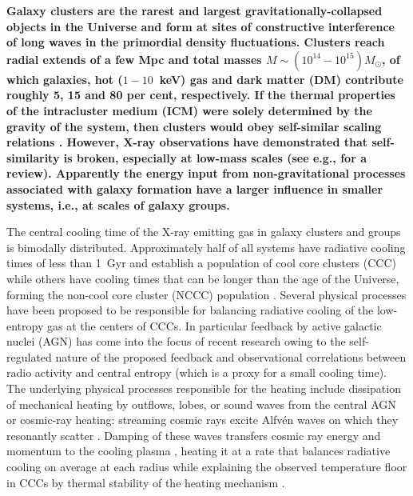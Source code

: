 \documentclass[useAMS,usenatbib]{mn2e}
\begin{document}
{\bf Galaxy clusters are the rarest and largest gravitationally-collapsed
  objects in the Universe and form at sites of constructive interference of long
  waves in the primordial density fluctuations. Clusters reach radial extends of
  a few Mpc and total masses $M \sim (10^{14} - 10^{15}) M_{\odot}$, of which
  galaxies, hot ($1-10$~keV) gas and dark matter (DM) contribute roughly 5, 15
  and 80 per cent, respectively. If the thermal properties of the intracluster medium
  (ICM) were solely determined by the gravity of the system, then clusters would
  obey self-similar scaling relations \citep{1986MNRAS.222..323K}.  However,
  X-ray observations have demonstrated that self-similarity is broken,
  especially at low-mass scales (see e.g., \citealp{2005RvMP...77..207V} for a
  review). Apparently the energy input from non-gravitational processes
  associated with galaxy formation have a larger influence in smaller systems,
  i.e., at scales of galaxy groups.

  The central cooling time of the X-ray emitting gas in galaxy clusters and
  groups is bimodally distributed. Approximately half of all systems have
  radiative cooling times of less than 1~Gyr and establish a population of cool
  core clusters (CCC) while others have cooling times that can be longer than
  the age of the Universe, forming the non-cool core cluster (NCCC) population
  \citep{2009ApJS..182...12C,2010A&A...513A..37H}. Several physical processes
  have been proposed to be responsible for balancing radiative cooling of the
  low-entropy gas at the centers of CCCs. In particular feedback by active
  galactic nuclei (AGN) has come into the focus of recent research
  \citep{2007ARA&A..45..117M, 2012NJPh...14e5023M} owing to the self-regulated
  nature of the proposed feedback and observational correlations between radio
  activity and central entropy (which is a proxy for a small cooling time). The
  underlying physical processes responsible for the heating include dissipation
  of mechanical heating by outflows, lobes, or sound waves from the central AGN
  \citep[e.g.,][]{2001ApJ...554..261C, 2002Natur.418..301B, 2002ApJ...581..223R,
    2012MNRAS.424..190G} or cosmic-ray heating: streaming cosmic rays excite
  Alfv\'en waves on which they resonantly scatter \citep{1969ApJ...156..445K}.
  Damping of these waves transfers cosmic ray energy and momentum to the cooling
  plasma \citep{1991ApJ...377..392L, 2008MNRAS.384..251G, 2011A&A...527A..99E,
    2013MNRAS.434.2209W}, heating it at a rate that balances radiative cooling
  on average at each radius while explaining the observed temperature floor in
  CCCs by thermal stability of the heating mechanism
  \citep{2013arXiv1303.5443P}.

}
\end{document}
